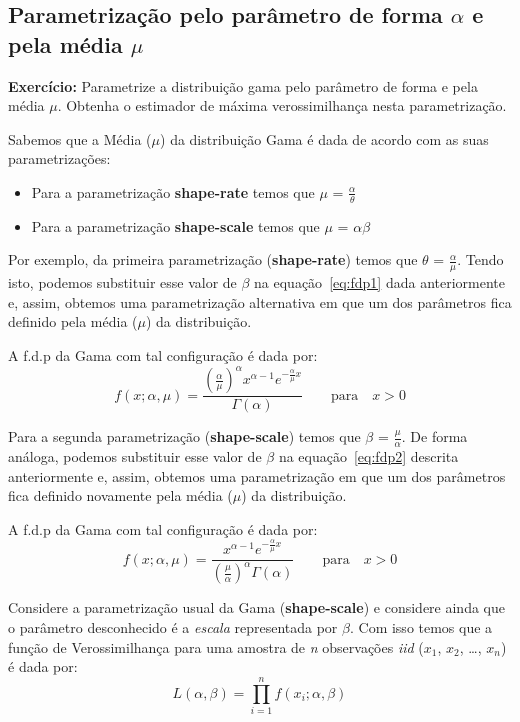 \subsection{Parametrização pelo parâmetro de forma $\alpha$ e pela média $\mu$}

\textbf{Exercício:} Parametrize a distribuição gama pelo parâmetro de forma e pela média $\mu$.
Obtenha o estimador de máxima verossimilhança nesta parametrização.

Sabemos que a Média ($\mu$) da distribuição Gama é dada de acordo com as suas parametrizações:
\begin{itemize}
\item Para a parametrização \textbf{shape-rate} temos que $\mu$ = $\frac{\alpha}{\theta}$
\item Para a parametrização \textbf{shape-scale} temos que $\mu$ = $\alpha \beta$
\end{itemize}

Por exemplo, da primeira parametrização (\textbf{shape-rate}) temos que $\theta$ = $\frac{\alpha}{\mu}$. Tendo isto, podemos substituir esse valor de $\beta$ na equação~\eqref{eq:fdp1} dada anteriormente e, assim, obtemos uma parametrização alternativa em que um dos parâmetros fica definido pela média ($\mu$) da distribuição.

A f.d.p da Gama com tal configuração é dada por:
\begin{equation}
f(x; \alpha, \mu )=\frac{(\frac{\alpha}{\mu})^{\alpha}x^{\alpha-1}e^{-\frac{\alpha}{\mu} x}}{\Gamma(\alpha)} \qquad \text{para} \quad x > 0
\end{equation}

Para a segunda parametrização (\textbf{shape-scale}) temos que $\beta$ = $\frac{\mu}{\alpha}$. De forma análoga, podemos substituir esse valor de $\beta$ na equação~\eqref{eq:fdp2} descrita anteriormente e, assim, obtemos uma parametrização em que um dos parâmetros fica definido novamente pela média ($\mu$) da distribuição.

A f.d.p da Gama com tal configuração é dada por: 
\begin{equation}
 f(x; \alpha, \mu) = \frac{x^{\alpha-1}e^{-\frac{\alpha }{\mu} x}}{(\frac{\mu}{\alpha})^{\alpha}\Gamma(\alpha)} \qquad \text{para} \quad x > 0
\end{equation}

Considere a parametrização usual da Gama (\textbf{shape-scale}) e considere ainda que o parâmetro desconhecido é a \textit{escala} representada por $\beta$. Com isso temos que a função de Verossimilhança para uma amostra de \emph{n} observações \emph{iid} ($x_1$, $x_2$, \dots, $x_n$) é dada por:
\begin{equation}
L(\alpha, \beta) = \prod_{i=1}^{n} f(x_i; \alpha, \beta)
\end{equation}

